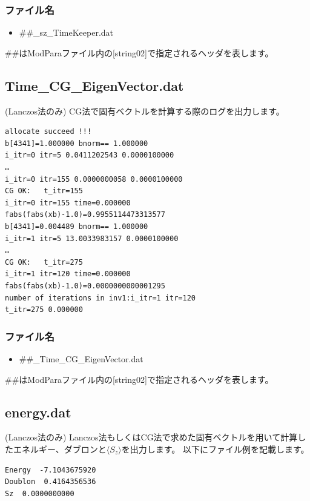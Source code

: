 \subsubsection{ファイル名}
 \begin{itemize}
   \item  \#\#\_sz\_TimeKeeper.dat
  \end{itemize}
  \#\#はModParaファイル内の[string02]で指定されるヘッダを表します。

\newpage
\subsection{Time\_CG\_EigenVector.dat}
\label{Subsec:timecgeigenv}
(Lanczos法のみ) CG法で固有ベクトルを計算する際のログを出力します。

\begin{minipage}{12.5cm}
\begin{screen}
\begin{verbatim}
allocate succeed !!! 
b[4341]=1.000000 bnorm== 1.000000 
i_itr=0 itr=5 0.0411202543 0.0000100000 
…
i_itr=0 itr=155 0.0000000058 0.0000100000 
CG OK:   t_itr=155 
i_itr=0 itr=155 time=0.000000  
fabs(fabs(xb)-1.0)=0.9955114473313577
b[4341]=0.004489 bnorm== 1.000000 
i_itr=1 itr=5 13.0033983157 0.0000100000 
…
CG OK:   t_itr=275 
i_itr=1 itr=120 time=0.000000  
fabs(fabs(xb)-1.0)=0.0000000000001295
number of iterations in inv1:i_itr=1 itr=120 
t_itr=275 0.000000
\end{verbatim}
\end{screen}
\end{minipage}
\subsubsection{ファイル名}
\begin{itemize}
   \item  \#\#\_Time\_CG\_EigenVector.dat
 \end{itemize}
  \#\#はModParaファイル内の[string02]で指定されるヘッダを表します。


\newpage
\subsection{energy.dat}
\label{subsec:energy.dat}
(Lanczos法のみ) Lanczos法もしくはCG法で求めた固有ベクトルを用いて計算したエネルギー、ダブロン{と$\langle S_z \rangle$}を出力します。
以下にファイル例を記載します。\\

\begin{minipage}{12.5cm}
\begin{screen}
\begin{verbatim}
Energy  -7.1043675920 
Doublon  0.4164356536 
Sz  0.0000000000 
\end{verbatim}
\end{screen}
\end{minipage}


